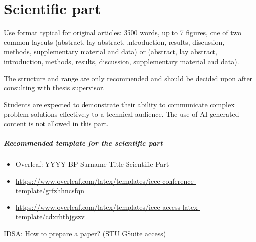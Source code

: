 \chapter{Scientific part}
\label{chapter:scientific-part}


Use format typical for original articles: 3500 words, up to 7 figures, one of two common layouts (abstract, lay abstract, introduction, results, discussion, methods, supplementary material and data) or (abstract, lay abstract, introduction, methods, results, discussion, supplementary material and data). 

The structure and range are only recommended and should be decided upon after consulting with thesis supervisor.

Students are expected to demonstrate their ability to communicate complex problem solutions effectively to a technical audience. The use of AI-generated content is not allowed in this part.

\paragraph{Recommended template for the scientific part}
\begin{itemize}
    \item Overleaf: YYYY-BP-Surname-Title-Scientific-Part
    \item \url{https://www.overleaf.com/latex/templates/ieee-conference-template/grfzhhncsfqn}
    \item \url{https://www.overleaf.com/latex/templates/ieee-access-latex-template/cdxrhtbjgszv}
\end{itemize}

\href{https://bit.ly/how-to-prepare-a-paper}{IDSA: How to prepare a paper?} (STU GSuite access)
